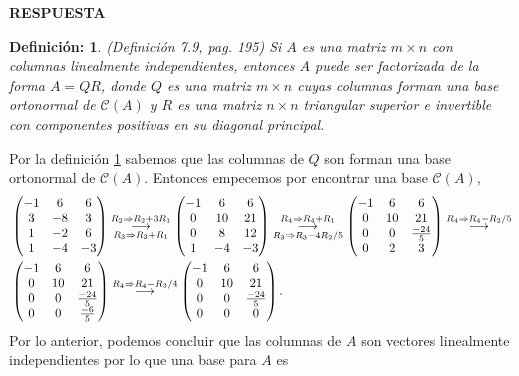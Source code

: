 \documentclass[11pt,letterpaper]{article}
\newcommand{\mcC}{\mathcal{C}}
\newcommand{\res}{\textbf{RESPUESTA}\\}
\newcommand{\grstep}[2][\relax]{%
   \ensuremath{\mathrel{
       {\mathop{\longrightarrow}\limits^{#2\mathstrut}_{
                                     \begin{subarray}{l} #1 \end{subarray}}}}}}
\newtheorem{thmd}{Definición:}
\begin{document}
\begin{itemize}
\res \begin{framed}
    \begin{thmd} \label{d_qr}
	(Definición 7.9, pag. 195) Si $A$ es una matriz $m \times n$ con columnas linealmente independientes, entonces $A$
puede ser factorizada de la forma $A = Q R$, donde $Q$ es una matriz $m \times n$ cuyas columnas forman una base ortonormal de $\mcC(A)$ y $R$ es una matriz $n\times n$ triangular
superior e invertible con componentes positivas en su diagonal principal.
    \end{thmd}
\end{framed}
Por la definición \ref{d_qr} sabemos que las columnas de $Q$ son forman una base ortonormal de $\mcC(A).$ Entonces empecemos por encontrar una base $\mcC(A)$,
\begin{align*}
&\begin{pmatrix}
-1 & 6 & 6\\
 3 &-8 & 3\\
 1 &-2 & 6\\
 1 &-4 &-3 
\end{pmatrix}%
\grstep[R_3\Rightarrow R_3+R_1]{R_2 \Rightarrow R_2+3R_1}
%
\begin{pmatrix}
-1 & 6 & 6 \\
0 & 10 & 21 \\
0 & 8 & 12 \\
1 & -4 & -3
\end{pmatrix}%
\grstep[R_3\Rightarrow R_3-4R_2/5]{R_4 \Rightarrow R_4+R_1}
%
\begin{pmatrix}
-1 & 6 & 6 \\
0 & 10 & 21 \\
0 & 0 & \frac{-24}{5} \\
0 & 2 & 3
\end{pmatrix}%
\grstep[]{R_4 \Rightarrow R_4-R_2/5}\\
&\begin{pmatrix}
-1 & 6 & 6 \\
0 & 10 & 21 \\
0 & 0 & \frac{-24}{5} \\
0 & 0 & \frac{-6}{5}
\end{pmatrix}%
\grstep[]{R_4 \Rightarrow R_4-R_3/4}
%
\begin{pmatrix}
-1 & 6 & 6 \\
0 & 10 & 21 \\
0 & 0 & \frac{-24}{5} \\
0 & 0 & 0
\end{pmatrix}.
\end{align*}
Por lo anterior, podemos concluir que las columnas de $A$ son  vectores linealmente independientes por lo que una base para $A$ es

\end{itemize}
\end{document}
